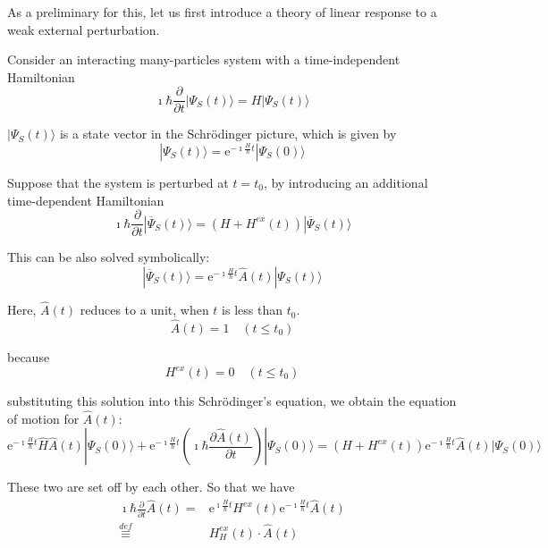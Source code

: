 As a preliminary for this, let us first introduce a theory of linear response to a weak external perturbation.

Consider an interacting many-particles system with a time-independent Hamiltonian
\[ \imath \hbar \frac{\partial}{\partial t} | \Psi_S(t) \rangle = H | \Psi_S (t) \rangle \]

$| \Psi_S (t) \rangle$ is a state vector in the Schr\"odinger picture, which is given by
\[| \Psi_S (t) \rangle = \mathrm{e}^{-\imath\frac{H}{\hbar}t}| \Psi_S (0) \rangle\]

Suppose that the system is perturbed at $t=t_0$, by introducing an additional time-dependent Hamiltonian
\begin{equation} \label{Eqs3.1.1}
\imath \hbar \frac{\partial}{\partial t} | \overline{\Psi}_S(t) \rangle = (H + H^{ex}(t))| \overline{\Psi}_S(t) \rangle
\end{equation}

This can be also solved symbolically:
\begin{equation} \label{Eqs3.1.2}
| \overline{\Psi}_S(t) \rangle = \mathrm{e}^{-\imath \frac{H}{\hbar}t}\hat{A}(t)  |\Psi_S(t) \rangle
\end{equation}

Here, $\hat{A}(t)$ reduces to a unit, when $t$ is less than $t_0$.
\begin{equation} \label{Eqs3.1.3}
\hat{A}(t) = 1 \quad (t \leq t_0)
\end{equation}

because
\[ H^{ex}(t) = 0 \quad (t \leq t_0) \]

substituting this solution into this Schr\"odinger's equation, we obtain the equation of motion for $\hat{A}(t)$:
\[ \mathrm{e}^{-\imath\frac{H}{\hbar}t}\hat{H}\hat{A}(t)|\Psi_S(0)\rangle + \mathrm{e}^{-\imath\frac{H}{\hbar}t}(\imath\hbar\frac{\partial \hat{A}(t)}{\partial t})|\Psi_S(0)\rangle = (H + H^{ex}(t))\mathrm{e}^{-\imath\frac{H}{\hbar}t}\hat{A}(t)|\Psi_S(0)\rangle \]

These two are set off by each other. So that we have
\begin{equation} \label{Eqs3.1.4} \begin{split}
\imath \hbar \frac{\partial}{\partial t}\hat{A}(t) =& \mathrm{e}^{\imath\frac{H}{\hbar}t}H^{ex}(t)\mathrm{e}^{-\imath\frac{H}{\hbar}t}\hat{A}(t)\\
\overset{def}{\equiv}& H_H^{ex}(t) \cdot \hat{A}(t)
\end{split}\end{equation}

